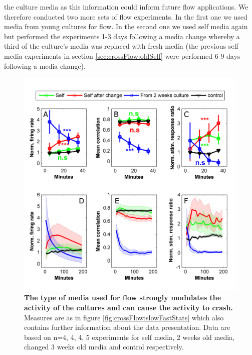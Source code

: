 the culture media as this information could inform future flow applications. We therefore conducted two more sets of flow experiments. In the first one we used media from young cultures for flow. In the second one we used self media again but performed the experiments 1-3 days following a media change whereby a third of the culture's media was replaced with fresh media (the previous self media experiments in section \ref{sec:crossFlow:oldSelf} were performed 6-9 days following a media change).

        \begin{figure}[!htb]
            \centering
            \includegraphics[width=15cm]{chapter5/figures/mediaChangeStats/mediaEffectStats.jpg}
            \caption[Averaged time course of activity measures in old cultures under flow with different media types]{\textbf{The type of media used for flow strongly modulates the activity of the cultures and can cause the activity to crash.} Measures are as in figure \ref{fig:crossFlow:slowFastStats} which also contains further information about the data presentation. Data are based on n=4, 4, 4, 5 experiments for self media, 2 weeks old media, changed 3 weeks old media and control respectively.}

            \label{fig:crossFlow:mediaChangeStats}

        \end{figure}

